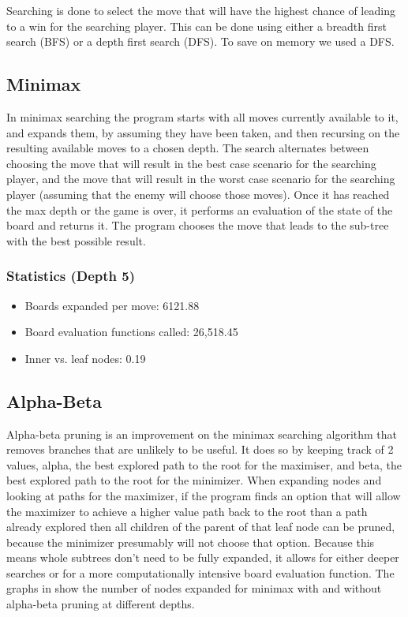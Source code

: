 \documentclass{article}
\begin{document}
Searching is done to select the move that will have the highest chance of
leading to a win for the searching player.  This can be done using either a
breadth first search (BFS) or a depth first search (DFS). To save on memory
we used a DFS.

\subsection{Minimax}

In minimax searching the program starts with all moves currently available to
it, and expands them, by assuming they have been taken, and then recursing on
the resulting available moves to a chosen depth. The search alternates between
choosing the move that will result in the best case scenario for the searching
player, and the move that will result in the worst case scenario for the
searching player (assuming that the enemy will choose those moves). Once it has
reached the max depth or the game is over, it performs an evaluation of the
state of the board and returns it. The program chooses the move that leads to
the sub-tree with the best possible result.

\subsubsection{Statistics (Depth 5)}
\begin{itemize}
	\item Boards expanded per move: 6121.88
	\item Board evaluation functions called: 26,518.45
	\item Inner vs. leaf nodes: 0.19
\end{itemize}

\subsection{Alpha-Beta}

Alpha-beta pruning is an improvement on the minimax searching algorithm that
removes branches that are unlikely to be useful. It does so by keeping track of
2 values, alpha, the best explored path to the root for the maximiser, and
beta, the best explored path to the root for the minimizer. When expanding
nodes and looking at paths for the maximizer, if the program finds an option
that will allow the maximizer to achieve a higher value path back to the root
than a path already explored then all children of the parent of that leaf node
can be pruned, because the minimizer presumably will not choose that option.
Because this means whole subtrees don’t need to be fully expanded, it allows
for either deeper searches  or for a more computationally intensive board
evaluation function. The graphs in  show the number of nodes expanded for
minimax with and without alpha-beta pruning at different depths.
\end{document}
